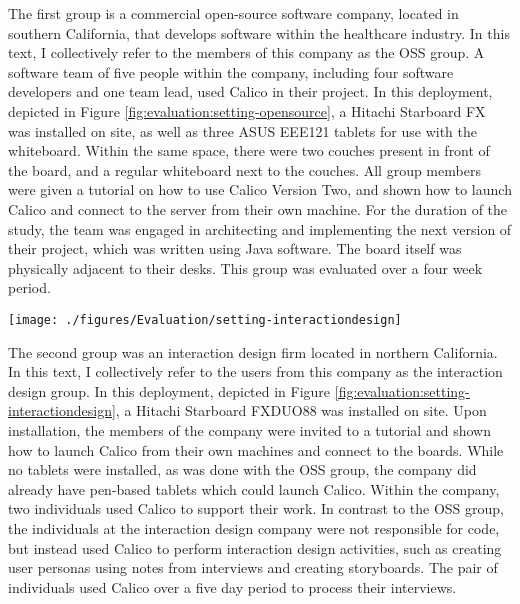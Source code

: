 \documentclass[12pt,fleqn]{ucithesis}
\begin{document}
The first group is a commercial open-source software company, located in southern California, that develops software within the healthcare industry. In this text, I collectively refer to the members of this company as the OSS group. A software team of five people within the company, including four software developers and one team lead, used Calico in their project. In this deployment, depicted in Figure \ref{fig:evaluation:setting-opensource}, a Hitachi Starboard FX was installed on site, as well as three ASUS EEE121 tablets for use with the whiteboard. Within the same space, there were two couches present in front of the board, and a regular whiteboard next to the couches. All group members were given a tutorial on how to use Calico Version Two, and shown how to launch Calico and connect to the server from their own machine.  For the duration of the study, the team was engaged in architecting and implementing the next version of their project, which was written using Java software. The board itself was physically adjacent to their desks. This group was evaluated over a four week period.

\begin{figure*}[tbh]
  \centering
  \texttt{[image: ./figures/Evaluation/setting-interactiondesign]}
  \caption{A tutorial of the usage of Calico given to the interaction design group.}
  \label{fig:evaluation:setting-interactiondesign}
\end{figure*}

The second group was an interaction design firm located in northern California. In this text, I collectively refer to the users from this company as the interaction design group. In this deployment, depicted in Figure \ref{fig:evaluation:setting-interactiondesign}, a Hitachi Starboard FXDUO88 was installed on site. Upon installation, the members of the company were invited to a tutorial and shown how to launch Calico from their own machines and connect to the boards. While no tablets were installed, as was done with the OSS group, the company did already have pen-based tablets which could launch Calico. Within the company, two individuals used Calico to support their work. In contrast to the OSS group, the individuals at the interaction design company were not responsible for code, but instead used Calico to perform interaction design activities, such as creating user personas using notes from interviews and creating storyboards. The pair of individuals used Calico over a five day period to process their interviews.
\end{document}
